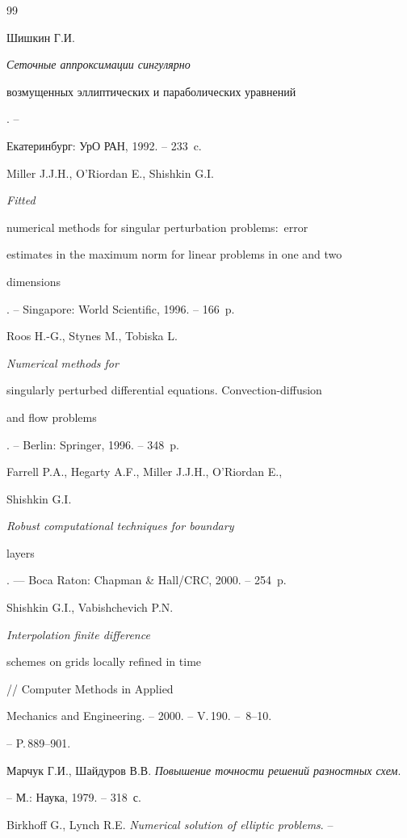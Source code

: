 \begin{thebibliography}{99}










Шишкин Г.И. {\em Сеточные аппроксимации сингулярно


возмущенных эллиптических и параболических уравнений}. --


Екатеринбург: УрО РАН, 1992. -- 233~c.




Miller J.J.H., O'Riordan E., Shishkin G.I. {\em Fitted


numerical methods for singular perturbation problems$:$ error


estimates in the maximum norm for linear problems in one and two


dimensions}. -- Singapore: World Scientific, 1996. -- 166~p.




Roos H.-G., Stynes M., Tobiska L. {\em Numerical methods for


singularly perturbed differential equations. Convection-diffusion


and flow problems}. -- Berlin: Springer, 1996. -- 348~p.




Farrell P.A., Hegarty A.F., Miller J.J.H., O'Riordan E.,


Shishkin G.I. {\em Robust computational techniques for boundary


layers}. --- Boca Raton: Chapman \& Hall/CRC, 2000. -- 254~p.




Shishkin G.I., Vabishchevich P.N. {\em Interpolation finite difference


schemes on grids locally refined in time} // Computer Methods in Applied


Mechanics and Engineering. -- 2000. -- V.\,190. -- \No\,8--10.


-- P.\,889--901.




Марчук Г.И., Шайдуров В.В. {\em Повышение точности решений разностных схем}.


-- М.: Наука, 1979. -- 318~с.




Birkhoff G., Lynch R.E. {\em Numerical solution of elliptic problems}. --



\end{thebibliography}
